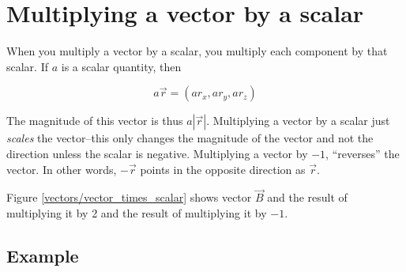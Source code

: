 \section*{Multiplying a vector by a scalar}

When you multiply a vector by a scalar, you multiply each component by that scalar. If $a$ is a scalar quantity, then

\begin{equation*}
	a\vec{r}= (ar_x, ar_y, ar_z)
\end{equation*}

The magnitude of this vector is thus $a|\vec{r}|$. Multiplying a vector by a scalar just \emph{scales} the vector--this only changes the magnitude of the vector and not the direction unless the scalar is negative. Multiplying a vector by $-1$, ``reverses'' the vector. In other words, $-\vec{r}$ points in the opposite direction as $\vec{r}$.

Figure \ref{vectors/vector_times_scalar} shows vector $\vec {B}$ and the result of multiplying it by 2 and the result of multiplying it by $-1$.


\subsection*{Example}



